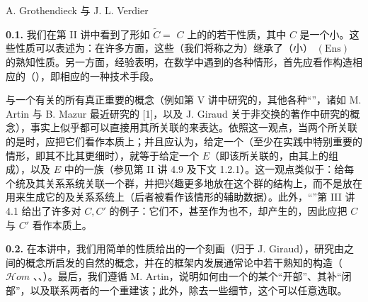 \begin{center}A. Grothendieck 与 J. L. Verdier\end{center}
\textbf{0.1.} 我们在第 II 讲中看到了形如 $\widetilde C=$ $C$ 上的的若干性质，其中 $C$ 是一个小。这些性质可以表述为：在许多方面，这些（我们将称之为）继承了（小） $(\mathrm{Ens})$ 的熟知性质。另一方面，经验表明，在数学中遇到的各种情形，首先应看作构造相应的（），即相应的一种技术手段。

与一个有关的所有真正重要的概念（例如第 V 讲中研究的，其他各种“”，诸如 M. Artin 与 B. Mazur 最近研究的 [1]，以及 J. Giraud 关于非交换的著作中研究的概念），事实上似乎都可以直接用其所关联的来表达。依照这一观点，当两个所关联的是时，应把它们看作本质上；并且应认为，给定一个（至少在实践中特别重要的情形，即其不比其更细时），就等于给定一个 $E$（即该所关联的，由其上的组成），以及 $E$ 中的一族（参见第 II 讲 4.9 及下文 1.2.1）。这一观点类似于：给每个统及其关系系统关联一个群，并把兴趣更多地放在这个群的结构上，而不是放在用来生成它的及关系系统上（后者被看作该情形的辅助数据）。此外，“”第 III 讲 4.1 给出了许多对 $C,C'$ 的例子：它们不，甚至作为也不，却产生的，因此应把 $C$ 与 $C'$ 看作本质上。

\textbf{0.2.} 在本讲中，我们用简单的性质给出的一个刻画（归于 J. Giraud），研究由之间的概念所启发的自然的概念，并在的框架内发展通常论中若干熟知的构造（$\mathscr Hom$ 、、）。最后，我们遵循 M. Artin，说明如何由一个的某个“开部”、其补“闭部”，以及联系两者的一个重建该；此外，除去一些细节，这个可以任意选取。


